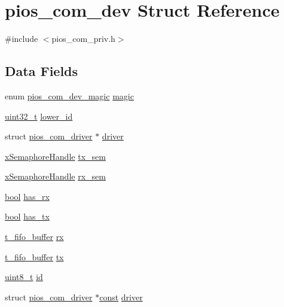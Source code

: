 \hypertarget{structpios__com__dev}{\section{pios\-\_\-com\-\_\-dev Struct Reference}
\label{structpios__com__dev}
}


{\ttfamily \#include $<$pios\-\_\-com\-\_\-priv.\-h$>$}

\subsection*{Data Fields}
\begin{DoxyCompactItemize}
\item 
enum \hyperlink{group___p_i_o_s___c_o_m_ga57d90f793d1e8323599fd11e929c945d}{pios\-\_\-com\-\_\-dev\-\_\-magic} \hyperlink{structpios__com__dev_ac886360255eb683d1be8e60bde922e69}{magic}
\item 
\hyperlink{stdint_8h_a435d1572bf3f880d55459d9805097f62}{uint32\-\_\-t} \hyperlink{structpios__com__dev_a3447468fdb0c7996c3669046d48b4cb6}{lower\-\_\-id}
\item 
struct \hyperlink{structpios__com__driver}{pios\-\_\-com\-\_\-driver} $\ast$ \hyperlink{structpios__com__dev_aece1c2098e93e78821b9b445e9198d3c}{driver}
\item 
\hyperlink{_common_2_libraries_2_free_r_t_o_s_2_source_2include_2semphr_8h_aa91aa1b6835a184838f9ccf138a6ad10}{x\-Semaphore\-Handle} \hyperlink{structpios__com__dev_adf20399b709462af4eafca64b6394aa3}{tx\-\_\-sem}
\item 
\hyperlink{_common_2_libraries_2_free_r_t_o_s_2_source_2include_2semphr_8h_aa91aa1b6835a184838f9ccf138a6ad10}{x\-Semaphore\-Handle} \hyperlink{structpios__com__dev_a7fc0be64ae4ec8b66c6cc9fb0d14a912}{rx\-\_\-sem}
\item 
\hyperlink{group___exported__types_gaf6a258d8f3ee5206d682d799316314b1}{bool} \hyperlink{structpios__com__dev_a0ef5c9630be8df13ab50070bbf65009c}{has\-\_\-rx}
\item 
\hyperlink{group___exported__types_gaf6a258d8f3ee5206d682d799316314b1}{bool} \hyperlink{structpios__com__dev_af723f3ee893a43d4ba3fff3e8ff6d3f7}{has\-\_\-tx}
\item 
\hyperlink{structt__fifo__buffer}{t\-\_\-fifo\-\_\-buffer} \hyperlink{structpios__com__dev_a505ae5ef4b8b02aa59d47da4275f9c48}{rx}
\item 
\hyperlink{structt__fifo__buffer}{t\-\_\-fifo\-\_\-buffer} \hyperlink{structpios__com__dev_a7a373bf857434538304aae2c831929c8}{tx}
\item 
\hyperlink{stdint_8h_aba7bc1797add20fe3efdf37ced1182c5}{uint8\-\_\-t} \hyperlink{structpios__com__dev_ad606472009d6e09d97b9ad621d12a643}{id}
\item 
struct \hyperlink{structpios__com__driver}{pios\-\_\-com\-\_\-driver} $\ast$\hyperlink{group___n_a_m_e_ga7ae6d0e43244213b34de2c2b9aa30da6}{const} \hyperlink{structpios__com__dev_ae2174a1f25b3842202d272f0e7588e25}{driver}
\end{DoxyCompactItemize}


